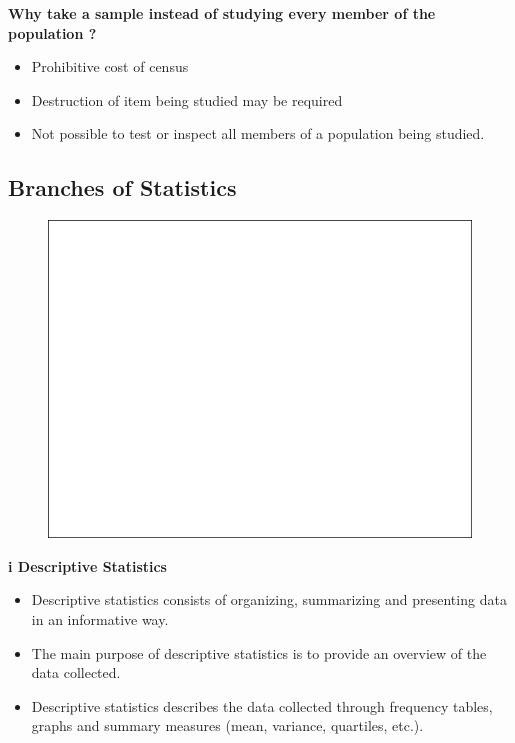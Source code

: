 \documentclass[]{book}
\providecommand{\tightlist}{%
  \setlength{\itemsep}{0pt}\setlength{\parskip}{0pt}}
\begin{document}
\textbf{Why take a sample instead of studying every member of the population ?}

\begin{itemize}
\tightlist
\item
  Prohibitive cost of census
\item
  Destruction of item being studied may be required
\item
  Not possible to test or inspect all members of a population being studied.
\end{itemize}

\hypertarget{branches-of-statistics}{%
\subsection{Branches of Statistics}\label{branches-of-statistics}}

\begin{figure}

{\centering \includegraphics[width=1\linewidth]{figure/box1-1} 

}

\end{figure}

\textbf{i Descriptive Statistics}

\begin{itemize}
\tightlist
\item
  Descriptive statistics consists of organizing, summarizing and presenting data in an informative way.
\item
  The main purpose of descriptive statistics is to provide an overview of the data collected.
\item
  Descriptive statistics describes the data collected through frequency tables, graphs and summary measures (mean, variance, quartiles, etc.).
\end{itemize}
\end{document}
